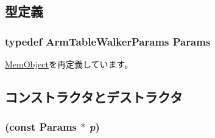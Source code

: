 \subsection{型定義}
\hypertarget{classArmISA_1_1TableWalker_a422d0236f689cd69d42b3163a521ea15}{
\subsubsection[{Params}]{\setlength{\rightskip}{0pt plus 5cm}typedef ArmTableWalkerParams {\bf Params}}}
\label{classArmISA_1_1TableWalker_a422d0236f689cd69d42b3163a521ea15}


\hyperlink{classMemObject_a905bbc621eeec0ed08859e21c8c95412}{MemObject}を再定義しています。

\subsection{コンストラクタとデストラクタ}
\hypertarget{classArmISA_1_1TableWalker_a94df4bedd6f27d12a3573b5169aa0db6}{
\subsubsection[{TableWalker}]{ (const {\bf Params} $\ast$ {\em p})}}
\label{classArmISA_1_1TableWalker_a94df4bedd6f27d12a3573b5169aa0db6}



